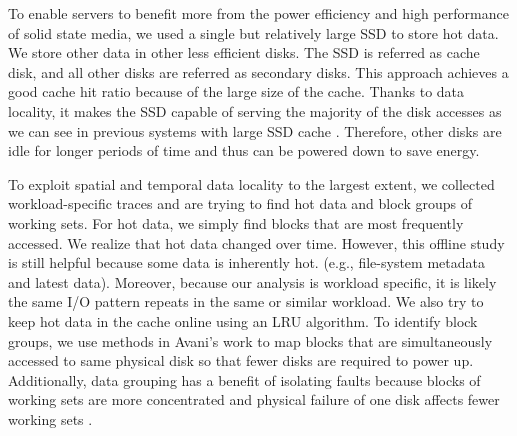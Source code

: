To enable servers to benefit more from the power efficiency and high
performance of solid state media, we used a single but relatively
large SSD to store hot data. We store other data in other less
efficient disks. The SSD is referred as cache disk, and all other
disks are referred as secondary disks. This approach achieves a good
cache hit ratio because of the large size of the cache. Thanks to data
locality, it makes the SSD capable of serving the majority of the disk
accesses as we can see in previous systems with large SSD cache
\cite{Debnath_SkimpyStash, Debnath_Bloomflash,
flashcache_experiments}. Therefore, other disks are idle for longer
periods of time and thus can be powered down to save energy. 


To exploit spatial and temporal data locality to the largest extent,
we collected workload-specific traces and are trying to find hot data
and block groups of working sets. For hot data, we simply find blocks
that are most frequently accessed. We realize that hot data changed
over time. However, this offline study is still helpful because some
data is inherently hot. (e.g., file-system metadata and latest data).
Moreover, because our analysis is workload specific, it is likely the
same I/O pattern repeats in the same or similar workload. We also try
to keep hot data in the cache online using an LRU algorithm. To
identify block groups, we use methods in Avani's work
\cite{Wildani_grouping} to map blocks that are simultaneously accessed
to same physical disk so that fewer disks are required to power up.
Additionally, data grouping has a benefit of isolating faults because
blocks of working sets are more concentrated and physical failure of
one disk affects fewer working sets \cite{Sivathanu_dgraid,
Wildani_grouping}. 

